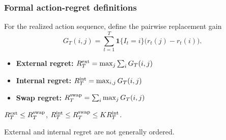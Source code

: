 \begin{frame}[noframenumbering]
  \frametitle{Formal action-regret definitions}

  \small
  For the realized action sequence, define the pairwise replacement gain
  \[
    G_T(i,j)=\sum_{t=1}^T \mathbf 1\{I_t=i\}\bigl(r_t(j)-r_t(i)\bigr).
  \]

  \vspace{0.08cm}
  \begin{itemize}
    \setlength{\itemsep}{0.16cm}
    \item \textbf{External regret:}\quad
      $R_T^{\rm ext}=\max_j \sum_i G_T(i,j)$
    \item \textbf{Internal regret:}\quad
      $R_T^{\rm int}=\max_{i,j} G_T(i,j)$
    \item \textbf{Swap regret:}\quad
      $R_T^{\rm swap}=\sum_i \max_j G_T(i,j)$
  \end{itemize}

  \vspace{0.08cm}
  \begin{center}
    $R_T^{\rm ext}\le R_T^{\rm swap}$,\qquad
    $R_T^{\rm int}\le R_T^{\rm swap}\le K R_T^{\rm int}$.

    \vspace{0.16cm}

    External and internal regret are not generally ordered.
  \end{center}
\end{frame}
